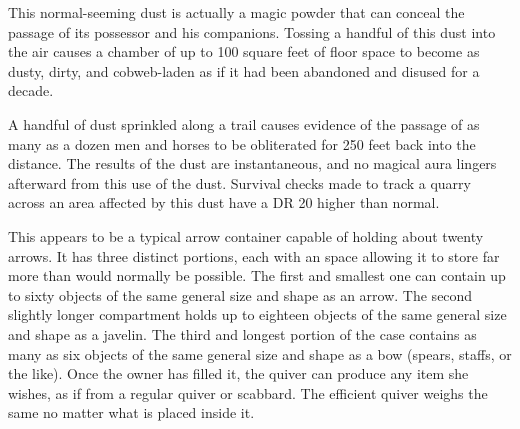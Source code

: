 {

 This normal-seeming dust is actually a magic powder that can conceal the passage of its possessor and his companions. Tossing a handful of this dust into the air causes a chamber of up to 100 square feet of floor space to become as dusty, dirty, and cobweb-laden as if it had been abandoned and disused for a decade.

A handful of dust sprinkled along a trail causes evidence of the passage of as many as a dozen men and horses to be obliterated for 250 feet back into the distance. The results of the dust are instantaneous, and no magical aura lingers afterward from this use of the dust. Survival checks made to track a quarry across an area affected by this dust have a DR 20 higher than normal.


 This appears to be a typical arrow container capable of holding about twenty arrows. It has three distinct portions, each with an  space allowing it to store far more than would normally be possible. The first and smallest one can contain up to sixty objects of the same general size and shape as an arrow. The second slightly longer compartment holds up to eighteen objects of the same general size and shape as a javelin. The third and longest portion of the case contains as many as six objects of the same general size and shape as a bow (spears, staffs, or the like). Once the owner has filled it, the quiver can produce any item she wishes, as if from a regular quiver or scabbard. The efficient quiver weighs the same no matter what is placed inside it.


\begin{comment}
Efreeti Bottle:} This item is typically fashioned of brass or bronze, with a lead stopper bearing special seals. A thin stream of smoke is often seen issuing from it. The bottle can be opened once per day. When opened, the efreeti imprisoned within issues from the bottle instantly. There is a 10\% chance (01?10 on d\%) that the efreeti is insane and attacks immediately upon being released. There is also a 10\% chance (91?100) that the efreeti of the bottle grants three wishes. In either case, the efreeti afterward disappears forever. The other 80\% of the time (11?90), the inhabitant of the bottle loyally serves the character for up to 10 minutes per day (or until the efreeti's death), doing as she commands. Roll each day the bottle is opened for that day's effect.


\end{comment}}
